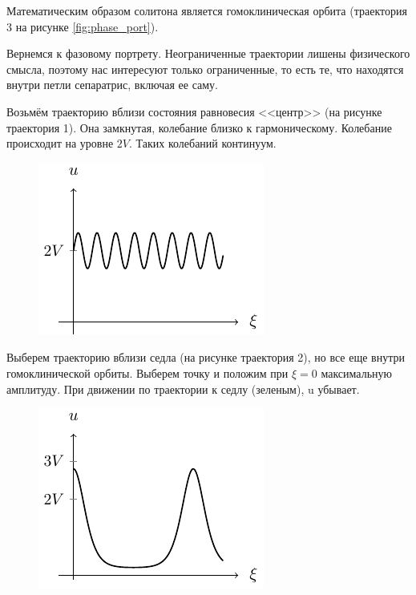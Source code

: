 Математическим {образом солитона является гомоклиническая орбита} (траектория 3 на рисунке \ref{fig:phase_port}).



Вернемся к фазовому портрету. Неограниченные траектории лишены физического смысла, поэтому нас интересуют только ограниченные, то есть те, что находятся внутри петли сепаратрис, включая ее саму.

Возьмём траекторию вблизи состояния равновесия <<центр>> (на рисунке траектория 1). Она замкнутая, колебание близко к гармоническому. Колебание происходит на уровне $2V$. Таких колебаний континуум. 
\begin{figure}[H]
	\centering
	\includegraphics[scale=1.5]{img/soliton/2v}
\end{figure}

Выберем траекторию вблизи седла (на рисунке траектория 2), но все еще внутри гомоклинической орбиты. Выберем точку и положим при $\xi=0$ максимальную амплитуду. При движении по траектории к седлу (зеленым), u убывает. 
\begin{figure}[H]
	\centering
	\includegraphics[scale=1.5]{img/soliton/25v}
\end{figure}

